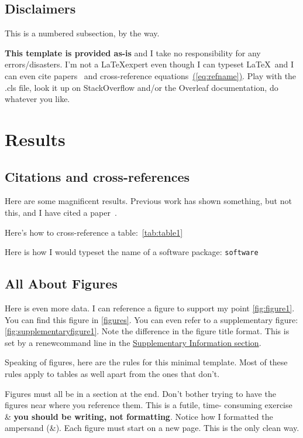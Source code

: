 \documentclass{getwriting}
\begin{document}
\subsection{Disclaimers}
This is a numbered subsection, by the way.
\par
\textbf{This template is provided as-is} and I take no responsibility for any errors/disasters. I'm not a \LaTeX expert even though I can typeset \LaTeX~and I can even cite papers~\cite{scbonita} and cross-reference equations~\hyperref[eq:refname]{(\autoref{eq:refname})}. Play with the .cls file, look it up on StackOverflow and/or the Overleaf documentation, do whatever you like.
\section{Results}\label{results}
\subsection{Citations and cross-references}
Here are some magnificent results. Previous work has shown something, but not this, and I have cited a paper~\cite{scbonita}. 
\par
Here's how to cross-reference a table:~\hyperref[tab:table1]{\autoref{tab:table1}}
\par
Here is how I would typeset the name of a software package: \lstinline{software}
\subsection{All About Figures}
Here is even more data. I can reference a figure to support my point \hyperref[fig:figure1]{\autoref{fig:figure1}}.
You can find this figure in \hyperref[figures]{\autoref{figures}}. You can even refer to a supplementary figure: \hyperref[fig:supplementaryfigure1]{\autoref{fig:supplementaryfigure1}}. Note the difference in the figure title format. This is set by a renewcommand line in the \hyperref[suppinfo]{Supplementary Information section}.
\par
Speaking of figures, here are the rules for this minimal template. Most of these rules apply to tables as well apart from the ones that don't.
\begin{outline}
    \1 Figures must all be in a section at the end. Don't bother trying to have the figures near where you reference them. This is a futile, time- consuming exercise \& \textbf{you should be writing, not formatting}. Notice how I formatted the ampersand (\&).
    \1 Each figure must start on a new page. This is the only clean way.
\end{outline}
\end{document}

